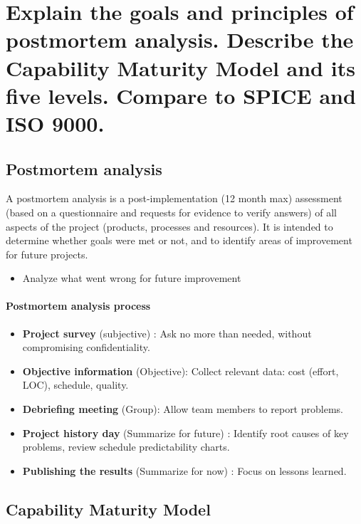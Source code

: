 \clearpage{}

\section{Explain the goals and principles of postmortem analysis. Describe
the Capability Maturity Model and its five levels. Compare to SPICE and ISO
9000.}

\subsection{Postmortem analysis}

A postmortem analysis is a post-implementation (12 month max) assessment
(based on a questionnaire and requests for evidence to verify answers) of all aspects of the
project (products, processes and resources). It is intended to determine whether
goals were met or not, and to identify areas of improvement for future projects.

\begin{itemize}
        \item Analyze what went wrong for future improvement 
    \end{itemize}

\paragraph{Postmortem analysis process}

\begin{itemize}
    \item \textbf{Project survey} (subjective) : Ask no more than needed, without compromising confidentiality.
    \item \textbf{Objective information} (Objective): Collect relevant data: cost (effort, LOC), schedule, quality.
    \item \textbf{Debriefing meeting} (Group): Allow team members to report problems.
    \item \textbf{Project history day} (Summarize for future) : Identify root causes of key problems, review schedule predictability charts.
    \item \textbf{Publishing the results} (Summarize for now) : Focus on lessons learned.
\end{itemize}

\subsection{Capability Maturity Model}

